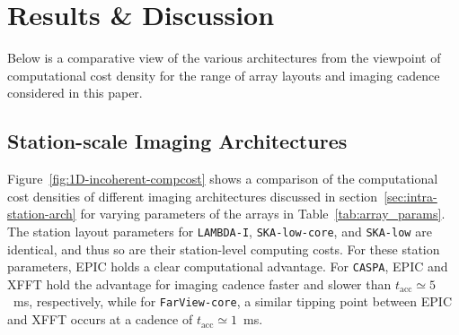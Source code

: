 \documentclass[
  journal=pasa,
  manuscript=article-type,
  year=2020,
  volume=37,
]{cup-journal}
\begin{document}




\section{Results \& Discussion} \label{sec:results}

Below is a comparative view of the various architectures from the viewpoint of computational cost density for the range of array layouts and imaging cadence considered in this paper. 

\subsection{Station-scale Imaging Architectures}\label{sec:station-scale-imaging}

Figure~\ref{fig:1D-incoherent-compcost} shows a comparison of the computational cost densities of different imaging architectures discussed in section~\ref{sec:intra-station-arch} for varying parameters of the arrays in Table~\ref{tab:array_params}. The station layout parameters for \texttt{LAMBDA-I}, \texttt{SKA-low-core}, and \texttt{SKA-low} are identical, and thus so are their station-level computing costs. For these station parameters, EPIC holds a clear computational advantage. For \texttt{CASPA}, EPIC and XFFT hold the advantage for imaging cadence faster and slower than $t_\textrm{acc}\simeq 5$~ms, respectively, while for \texttt{FarView-core}, a similar tipping point between EPIC and XFFT occurs at a cadence of $t_\textrm{acc}\simeq 1$~ms.
\end{document}
